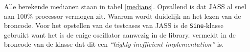 Alle berekende medianen staan in tabel \ref{medians}. Opvallend is dat JASS al snel aan 100\% processor vermogen zit. Waarom wordt duidelijk na het lezen van de broncode. Voor het opstellen van de testcases van JASS is de \verb+Sine+-klasse gebruikt want het is de enige oscillator aanwezig in de library. \textcite{jasscode} vermeldt in de broncode van de klasse dat dit een \textit{``highly inefficient implementation''} is.



